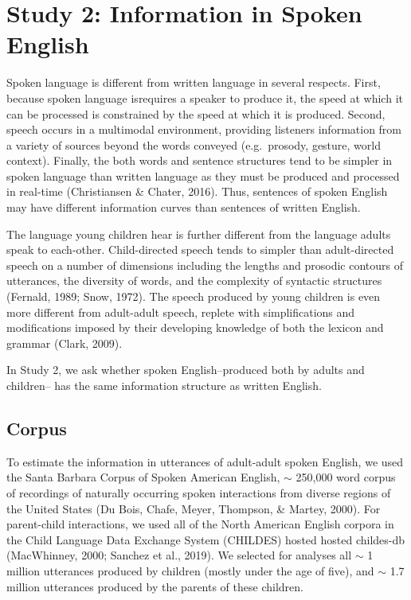 \documentclass[10pt, letterpaper]{article}
\begin{document}
\hypertarget{study-2-information-in-spoken-english}{%
\section{Study 2: Information in Spoken
English}\label{study-2-information-in-spoken-english}}

Spoken language is different from written language in several respects.
First, because spoken language isrequires a speaker to produce it, the
speed at which it can be processed is constrained by the speed at which
it is produced. Second, speech occurs in a multimodal environment,
providing listeners information from a variety of sources beyond the
words conveyed (e.g.~prosody, gesture, world context). Finally, the both
words and sentence structures tend to be simpler in spoken language than
written language as they must be produced and processed in real-time
(Christiansen \& Chater, 2016). Thus, sentences of spoken English may
have different information curves than sentences of written English.

The language young children hear is further different from the language
adults speak to each-other. Child-directed speech tends to simpler than
adult-directed speech on a number of dimensions including the lengths
and prosodic contours of utterances, the diversity of words, and the
complexity of syntactic structures (Fernald, 1989; Snow, 1972). The
speech produced by young children is even more different from
adult-adult speech, replete with simplifications and modifications
imposed by their developing knowledge of both the lexicon and grammar
(Clark, 2009).

In Study 2, we ask whether spoken English--produced both by adults and
children-- has the same information structure as written English.

\hypertarget{corpus-1}{%
\subsection{Corpus}\label{corpus-1}}

To estimate the information in utterances of adult-adult spoken English,
we used the Santa Barbara Corpus of Spoken American English, \(\sim\)
250,000 word corpus of recordings of naturally occurring spoken
interactions from diverse regions of the United States (Du Bois, Chafe,
Meyer, Thompson, \& Martey, 2000). For parent-child interactions, we
used all of the North American English corpora in the Child Language
Data Exchange System (CHILDES) hosted hosted childes-db (MacWhinney,
2000; Sanchez et al., 2019). We selected for analyses all \(\sim\) 1
million utterances produced by children (mostly under the age of five),
and \(\sim\) 1.7 million utterances produced by the parents of these
children.
\end{document}
